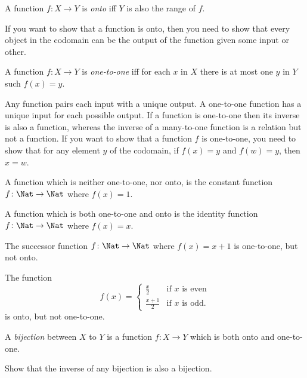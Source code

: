 \documentclass[../../include/open-logic-section]{subfiles}
\begin{document}

\begin{defn}
A function $f \colon X \rightarrow Y$ is \emph{onto} iff $Y$ is also the range of $f$.
\end{defn}

\begin{explain}
If you want to show that a function is onto, then you need to show that every object in the codomain can be the output of the function given some input or other.
\end{explain}

\begin{defn}
A function $f \colon X \rightarrow Y$ is \emph{one-to-one} iff for each $x$ in $X$ there is at most one $y$ in $Y$ such $f(x)=y$.
\end{defn}

\begin{explain}
Any function pairs each input with a unique output. A one-to-one function has a unique input for each possible output. If a function is one-to-one then its inverse is also a function, whereas the inverse of a many-to-one function is a relation but not a function. If you want to show that a function $f$ is one-to-one, you need to show that for any element $y$ of the codomain, if $f(x)=y$ and $f(w)=y$, then $x=w$.

A function which is neither one-to-one, nor onto, is the constant function $f\colon \Nat \rightarrow \Nat$ where $f(x) = 1$.
    
A function which is both one-to-one and onto is the identity function $f\colon \Nat \rightarrow \Nat$ where $f(x) = x$.

The successor function $f \colon \Nat \rightarrow \Nat$ where $f(x) = x+1$ is one-to-one, but not onto.

The function 
\[
f(x) = 
\begin{cases}
  \frac{x}{2} & \text{if $x$ is even} \\
  \frac{x+1}{2} & \text{if $x$ is odd.}
\end{cases}
\]
is onto, but not one-to-one.

\end{explain}

\begin{defn}
A \emph{bijection} between $X$ to $Y$ is a function $f \colon X \rightarrow Y$ which is both onto and one-to-one.
\end{defn}

\begin{prob}
Show that the inverse of any bijection is also a bijection.
\end{prob}
\end{document}
